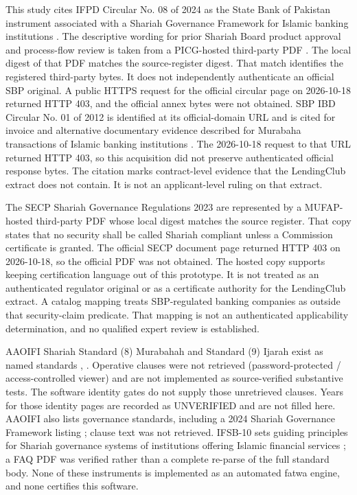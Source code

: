 \documentclass{ieeeaccess}
\begin{document}
This study cites IFPD Circular No. 08 of 2024 as the State Bank of Pakistan instrument associated with a Shariah Governance Framework for Islamic banking institutions \cite{b24}. The descriptive wording for prior Shariah Board product approval and process-flow review is taken from a PICG-hosted third-party PDF \cite{b25}. The local digest of that PDF matches the source-register digest. That match identifies the registered third-party bytes. It does not independently authenticate an official SBP original. A public HTTPS request for the official circular page on 2026-10-18 returned HTTP 403, and the official annex bytes were not obtained. SBP IBD Circular No. 01 of 2012 is identified at its official-domain URL and is cited for invoice and alternative documentary evidence described for Murabaha transactions of Islamic banking institutions \cite{b26}. The 2026-10-18 request to that URL returned HTTP 403, so this acquisition did not preserve authenticated official response bytes. The citation marks contract-level evidence that the LendingClub extract does not contain. It is not an applicant-level ruling on that extract.

The SECP Shariah Governance Regulations 2023 are represented by a MUFAP-hosted third-party PDF \cite{b27} whose local digest matches the source register. That copy states that no security shall be called Shariah compliant unless a Commission certificate is granted. The official SECP document page returned HTTP 403 on 2026-10-18, so the official PDF was not obtained. The hosted copy supports keeping certification language out of this prototype. It is not treated as an authenticated regulator original or as a certificate authority for the LendingClub extract. A catalog mapping treats SBP-regulated banking companies as outside that security-claim predicate. That mapping is not an authenticated applicability determination, and no qualified expert review is established.

AAOIFI Shariah Standard (8) Murabahah and Standard (9) Ijarah exist as named standards \cite{b28}, \cite{b29}. Operative clauses were not retrieved (password-protected / access-controlled viewer) and are not implemented as source-verified substantive tests. The software identity gates do not supply those unretrieved clauses. Years for those identity pages are recorded as UNVERIFIED and are not filled here. AAOIFI also lists governance standards, including a 2024 Shariah Governance Framework listing \cite{b30}; clause text was not retrieved. IFSB-10 sets guiding principles for Shariah governance systems of institutions offering Islamic financial services \cite{b31}; a FAQ PDF was verified rather than a complete re-parse of the full standard body. None of these instruments is implemented as an automated fatwa engine, and none certifies this software.
\end{document}
